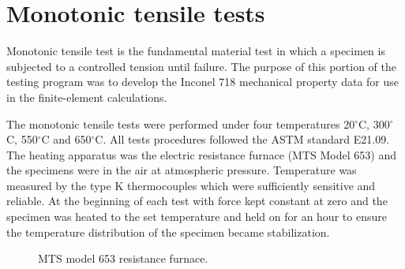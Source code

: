 \section{Monotonic tensile tests}
\noindent Monotonic tensile test is the fundamental material test in which a specimen is subjected to a controlled tension until failure.
The purpose of this portion of the testing program was to develop the Inconel 718 mechanical property data for use in the finite-element calculations.

The monotonic tensile tests were performed under four temperatures 20$^{\circ}$C, 300$^{\circ}$C, 550$^{\circ}$C and 650$^{\circ}$C.
All tests procedures followed the ASTM standard E21.09.
The heating apparatus was the electric resistance furnace (MTS Model 653) and the specimens were in the air at atmospheric pressure.
Temperature was measured by the type K thermocouples which were sufficiently sensitive and reliable.
At the beginning of each test with force kept constant at zero and the specimen was heated to the set temperature and held on for an hour to ensure the temperature distribution of the specimen became stabilization.

\begin{figure}[!htp]
\caption{MTS model 653 resistance furnace.}
\label{Fig:Furnace653_1}
\end{figure}

